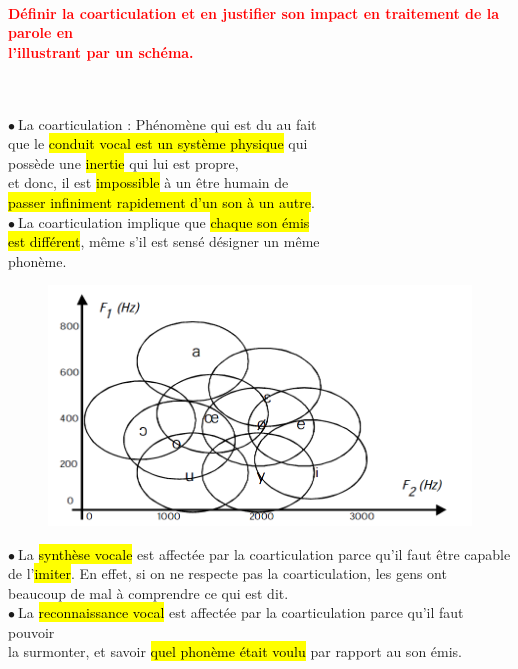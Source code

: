 \documentclass[letterpaper, 12pt]{article}
\newcommand{\alinea}{
\hspace*{0.3cm}}
\newcommand{\red}[1]{
	\textcolor{red}{#1}
}
\newcommand{\point}{$\bullet\ $}
\begin{document}
		\paragraph{\red{Définir la coarticulation et en justifier son impact en traitement de la parole en 
		~\\ \hspace*{0.035cm} l'illustrant par un schéma.}}~\\
			\begin{minipage}{0.55\textwidth}
				\point La coarticulation : Ph\'enom\`ene qui est du au fait \\\alinea que le 
				\hl{conduit vocal est un syst\`eme
				physique} qui \\\alinea poss\`ede une \hl{inertie} qui lui est propre, 
				\\\alinea et donc, il est \hl{impossible} à 
				 un \^etre humain de \\\alinea \hl{passer infiniment rapidement d'un son \`a un autre}.\\
			\point La coarticulation implique que \hl{chaque son \'emis} \\\alinea \hl{est diff\'erent}, même s'il 
				est sensé désigner un même \\\alinea phon\`eme.
			\end{minipage}\hfill
			\begin{minipage}{0.4\textwidth}
				\begin{figure}[H]
					\centering
					\includegraphics[scale=0.5]{Images/coarticulation}
				\end{figure}\noindent
			\end{minipage}
			\point La \hl{synth\`ese vocale} est affect\'ee par la coarticulation parce qu'il faut \^etre capable 
				\\\alinea de l'\hl{imiter}. En effet, si on ne respecte pas la coarticulation, les gens ont
				\\\alinea beaucoup de mal à comprendre ce qui est dit.\\
			\point La \hl{reconnaissance vocal} est affect\'ee par la coarticulation parce qu'il faut pouvoir 
				\\\alinea la surmonter, et savoir \hl{quel phon\`eme \'etait voulu} par rapport au son émis. 
	
\end{document}
